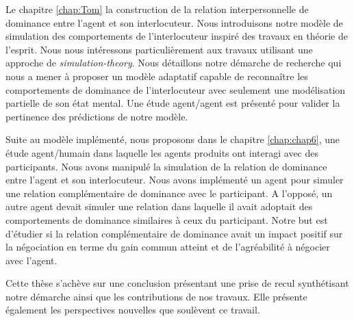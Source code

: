 Le chapitre \ref{chap:Tom} la construction de la relation interpersonnelle de dominance entre l'agent et son interlocuteur. 
Nous introduisons notre modèle de simulation des comportements de l'interlocuteur inspiré des travaux en théorie de l'esprit. Nous nous intéressons particulièrement aux travaux utilisant une approche de \emph{simulation-theory}.
Nous détaillons notre démarche de recherche qui nous a mener à proposer un modèle adaptatif capable de reconnaître les comportements de dominance de l'interlocuteur avec seulement une modélisation partielle de son état mental.
Une étude agent/agent est présenté pour valider la pertinence des prédictions de notre modèle. 
 
Suite au modèle implémenté, nous proposons dans le chapitre \ref{chap:chap6}, une étude agent/humain dans laquelle les agents produits ont interagi avec des participants. Nous avons manipulé la simulation de la relation de dominance entre l'agent et son interlocuteur. Nous avons implémenté un agent pour simuler une relation complémentaire de dominance avec le participant. A l'opposé, un autre agent devait simuler une relation dans laquelle il avait adoptait des comportements de dominance similaires à ceux du participant. Notre but est d'étudier si la relation complémentaire de dominance avait un impact positif sur la négociation en terme du gain commun atteint et de l'agréabilité à négocier avec l'agent. 

Cette thèse s’achève sur une conclusion présentant une prise de recul synthétisant notre démarche ainsi que les contributions de nos travaux. Elle présente également les perspectives nouvelles que soulèvent ce travail.
